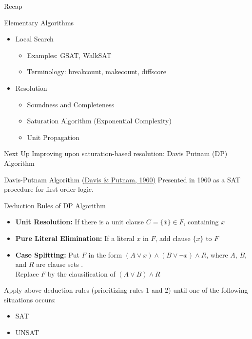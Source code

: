 \documentclass[t]{sdqbeamer}
\begin{document}
\begin{frame}{Recap}
	\begin{block}{Elementary Algorithms}
		\begin{itemize}\setlength{\itemsep}{1ex}
			\item Local Search
			\begin{itemize}
				\item Examples: GSAT, WalkSAT
				\item Terminology: breakcount, makecount, diffscore
			\end{itemize}
			\item Resolution
			\begin{itemize}
				\item Soundness and Completeness
				\item Saturation Algorithm (Exponential Complexity)
				\item Unit Propagation
			\end{itemize}
		\end{itemize}
	\end{block}
	\pause
	\begin{block}{Next Up}
		Improving upon saturation-based resolution: Davis Putnam (DP) Algorithm
	\end{block}
\end{frame}

\begin{frame}{Davis-Putnam Algorithm \href{http://doi.acm.org/10.1145/321033.321034}{(Davis \& Putnam, 1960)}}
	Presented in 1960 as a SAT procedure for first-order logic.
	\begin{block}{Deduction Rules of DP Algorithm}
		\begin{itemize}\setlength{\itemsep}{1em}
			\item \textbf{Unit Resolution:} If there is a unit clause $C = \{ \overline x \} \in F$, 
			 containing $x$
			\item \textbf{Pure Literal Elimination:} If a literal $x$  in $F$, add clause $\{ x \}$ to $F$
			\item \textbf{Case Splitting:} Put $F$ in the form $(A \lor x) \land (B \lor \lnot x) \land R$,
			where $A$, $B$, and $R$ are clause sets .\\
			Replace $F$ by the clausification of $(A \lor B) \land R$
		\end{itemize}
	\end{block}
	
	\vspace*{3mm}
	Apply above deduction rules (prioritizing rules 1 and 2) until one of the following situations occurs: 
	\begin{itemize}
		\item {} SAT
		\item {} UNSAT
	\end{itemize}
\end{frame}
\end{document}
